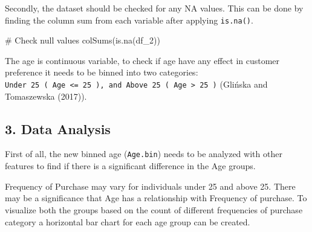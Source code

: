 \documentclass[
  letterpaper,
  DIV=11,
  numbers=noendperiod]{scrartcl}
\newenvironment{Shaded}{\begin{snugshade}}{\end{snugshade}}
\newcommand{\CommentTok}[1]{\textcolor[rgb]{0.37,0.37,0.37}{#1}}
\newcommand{\DecValTok}[1]{\textcolor[rgb]{0.68,0.00,0.00}{#1}}
\newcommand{\FunctionTok}[1]{\textcolor[rgb]{0.28,0.35,0.67}{#1}}
\newcommand{\NormalTok}[1]{\textcolor[rgb]{0.00,0.23,0.31}{#1}}
\newcommand{\OtherTok}[1]{\textcolor[rgb]{0.00,0.23,0.31}{#1}}
\newcommand{\SpecialCharTok}[1]{\textcolor[rgb]{0.37,0.37,0.37}{#1}}
\newcommand{\StringTok}[1]{\textcolor[rgb]{0.13,0.47,0.30}{#1}}
\begin{document}
Secondly, the dataset should be checked for any NA values. This can be
done by finding the column sum from each variable after applying
\texttt{is.na()}.

\begin{Shaded}
\begin{Highlighting}[]
\CommentTok{\# Check null values}
\FunctionTok{colSums}\NormalTok{(}\FunctionTok{is.na}\NormalTok{(df\_2))}
\end{Highlighting}
\end{Shaded}

The age is continuous variable, to check if age have any effect in
customer preference it needs to be binned into two categories:
\texttt{Under\ 25\ (\ Age\ \textless{}=\ 25\ ),\ and\ Above\ 25\ (\ Age\ \textgreater{}\ 25\ )}
(Glińska and Tomaszewska (2017)).

\begin{Shaded}
\end{Shaded}

\subsection{3. Data Analysis}\label{data-analysis}

First of all, the new binned age (\texttt{Age.bin}) needs to be analyzed
with other features to find if there is a significant difference in the
Age groups.

Frequency of Purchase may vary for individuals under 25 and above 25.
There may be a significance that Age has a relationship with Frequency
of purchase. To visualize both the groups based on the count of
different frequencies of purchase category a horizontal bar chart for
each age group can be created.
\end{document}
